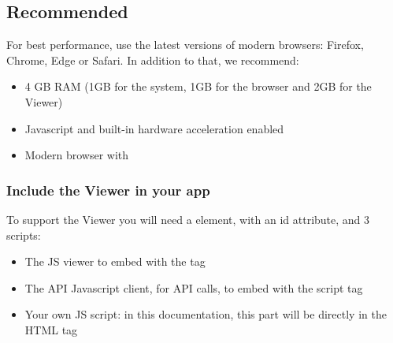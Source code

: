 \documentclass[a4paper,12pt,english]{sphinxmanual}
\begin{document}
\subsection{Recommended}
\label{\detokenize{viewer/index:recommended}}
For best performance, use the latest versions of modern browsers: Firefox, Chrome, Edge or Safari.
In addition to that, we recommend:
\begin{itemize}
\item {} 
4 GB RAM (1GB for the system, 1GB for the browser and 2GB for the Viewer)

\item {} 
Javascript and built-in hardware acceleration enabled

\item {} 
Modern browser with %
\begin{footnote}[14]\sphinxAtStartFootnote
{}
%
\end{footnote}

\end{itemize}


\subsubsection{Include the Viewer in your app}
\label{\detokenize{viewer/include_viewer:include-the-viewer-in-your-app}}\label{\detokenize{viewer/include_viewer::doc}}
To support the Viewer you will need a  element, with an id attribute, and 3 scripts:
\begin{itemize}
\item {} 
The JS viewer to embed with the  tag

\item {} 
The API Javascript client, for API calls, to embed with the script tag

\item {} 
Your own JS script: in this documentation, this part will be directly in the HTML  tag

\end{itemize}

%
\begin{sphinxVerbatim}[commandchars=\\\{\}]
     
\end{sphinxVerbatim}
\end{document}
